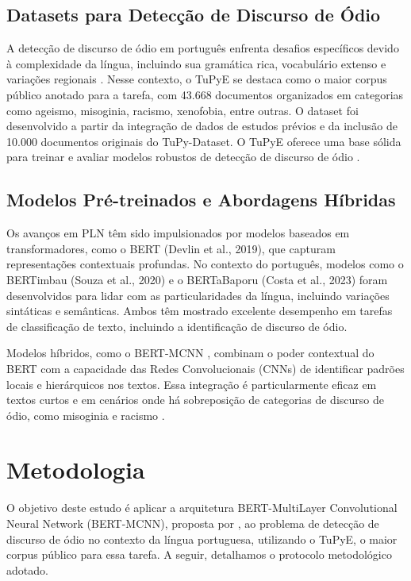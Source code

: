 \documentclass[sigconf,nonacm]{acmart}
\begin{document}
\subsection{Datasets para Detecção de Discurso de Ódio}
A detecção de discurso de ódio em português enfrenta desafios específicos devido à complexidade da língua, incluindo sua gramática rica, vocabulário extenso e variações regionais \cite{fortuna-etal-2019-hierarchically}. Nesse contexto, o TuPyE se destaca como o maior corpus público anotado para a tarefa, com 43.668 documentos organizados em categorias como ageismo, misoginia, racismo, xenofobia, entre outras. O dataset foi desenvolvido a partir da integração de dados de estudos prévios \cite{fortuna-etal-2019-hierarchically} \cite{leite2020toxiclanguagedetectionsocial} \cite{vargas-etal-2022-hatebr} e da inclusão de 10.000 documentos originais do TuPy-Dataset. O TuPyE oferece uma base sólida para treinar e avaliar modelos robustos de detecção de discurso de ódio \cite{oliveira2023tupye}.

\subsection{Modelos Pré-treinados e Abordagens Híbridas}
Os avanços em PLN têm sido impulsionados por modelos baseados em transformadores, como o BERT (Devlin et al., 2019), que capturam representações contextuais profundas. No contexto do português, modelos como o BERTimbau (Souza et al., 2020) e o BERTaBaporu (Costa et al., 2023) foram desenvolvidos para lidar com as particularidades da língua, incluindo variações sintáticas e semânticas. Ambos têm mostrado excelente desempenho em tarefas de classificação de texto, incluindo a identificação de discurso de ódio.

Modelos híbridos, como o BERT-MCNN \cite{ATANDOH2023101578}, combinam o poder contextual do BERT com a capacidade das Redes Convolucionais (CNNs) de identificar padrões locais e hierárquicos nos textos. Essa integração é particularmente eficaz em textos curtos e em cenários onde há sobreposição de categorias de discurso de ódio, como misoginia e racismo \cite{ATANDOH2023101578} \cite{leite2020toxiclanguagedetectionsocial}.

\section{Metodologia}

O objetivo deste estudo é aplicar a arquitetura BERT-MultiLayer Convolutional Neural Network (BERT-MCNN), proposta por \cite{ATANDOH2023101578}, ao problema de detecção de discurso de ódio no contexto da língua portuguesa, utilizando o TuPyE\cite{oliveira2023tupye}, o maior corpus público para essa tarefa. A seguir, detalhamos o protocolo metodológico adotado.
\end{document}
